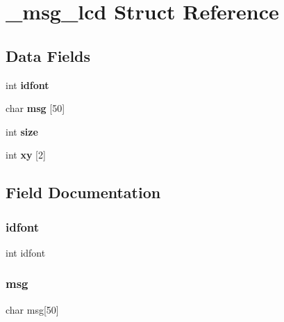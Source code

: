 \hypertarget{struct__msg__lcd}{}\section{\+\_\+msg\+\_\+lcd Struct Reference}
\label{struct__msg__lcd}
\subsection*{Data Fields}
\begin{DoxyCompactItemize}
\item
\hypertarget{struct__msg__lcd_a920bed898c8aa0c621de98b072beb7d7}{}\label{struct__msg__lcd_a920bed898c8aa0c621de98b072beb7d7}
int {\bfseries idfont}
\item
\hypertarget{struct__msg__lcd_ae4f3f55be5de649fd367081b9d1b4b0c}{}\label{struct__msg__lcd_ae4f3f55be5de649fd367081b9d1b4b0c}
char {\bfseries msg} \mbox{[}50\mbox{]}
\item
\hypertarget{struct__msg__lcd_a439227feff9d7f55384e8780cfc2eb82}{}\label{struct__msg__lcd_a439227feff9d7f55384e8780cfc2eb82}
int {\bfseries size}
\item
\hypertarget{struct__msg__lcd_a4e3cffd47e372183af356a20d713d7d4}{}\label{struct__msg__lcd_a4e3cffd47e372183af356a20d713d7d4}
int {\bfseries xy} \mbox{[}2\mbox{]}
\end{DoxyCompactItemize}


\subsection{Field Documentation}
\hypertarget{struct__msg__lcd_a920bed898c8aa0c621de98b072beb7d7}{}\label{struct__msg__lcd_a920bed898c8aa0c621de98b072beb7d7}
\subsubsection{\texorpdfstring{idfont}{idfont}}
{\footnotesize\ttfamily int idfont}

\hypertarget{struct__msg__lcd_ae4f3f55be5de649fd367081b9d1b4b0c}{}\label{struct__msg__lcd_ae4f3f55be5de649fd367081b9d1b4b0c}
\subsubsection{\texorpdfstring{msg}{msg}}
{\footnotesize\ttfamily char msg\mbox{[}50\mbox{]}}

